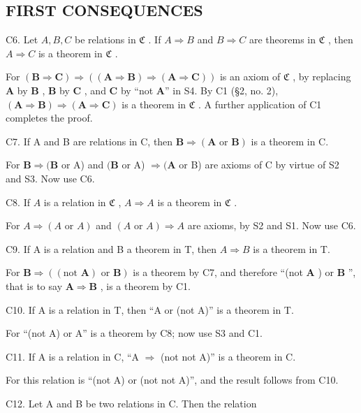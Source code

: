 \subsection{FIRST CONSEQUENCES}

C6. Let \(A, B, C\) be relations in \(\mathfrak{C}\) . If \(A \Longrightarrow B\) and \(B \Longrightarrow C\) are theorems in \(\mathfrak{C}\) , then \(A \Longrightarrow C\) is a theorem in \(\mathfrak{C}\) .

For \((\pmb{B} \Rightarrow \pmb{C}) \Rightarrow ((\pmb{A} \Rightarrow \pmb{B}) \Rightarrow (\pmb{A} \Rightarrow \pmb{C}))\) is an axiom of \(\mathfrak{C}\) , by replacing \(\pmb{A}\) by \(\pmb{B}\) , \(\pmb{B}\) by \(\pmb{C}\) , and \(\pmb{C}\) by ``not \(\pmb{A}\)'' in S4. By C1 (§2, no. 2), \((\pmb{A} \Rightarrow \pmb{B}) \Rightarrow (\pmb{A} \Rightarrow \pmb{C})\) is a theorem in \(\mathfrak{C}\) . A further application of C1 completes the proof.

C7. If A and B are relations in C, then \(\mathbf{B} \Longrightarrow (\mathbf{A} \text{ or } \mathbf{B})\) is a theorem in C.

For \(\boldsymbol{B}\Longrightarrow(\boldsymbol{B}\) or A) and \((\boldsymbol{B}\) or A) \(\Longrightarrow(\boldsymbol{A}\) or B) are axioms of C by virtue of S2 and S3. Now use C6.

C8. If \(A\) is a relation in \(\mathfrak{C}\) , \(A \Longrightarrow A\) is a theorem in \(\mathfrak{C}\) .

For \(A \Longrightarrow (A \text{ or } A)\) and \((A \text{ or } A) \Longrightarrow A\) are axioms, by S2 and S1. Now use C6.

C9. If A is a relation and B a theorem in T, then \(A \Longrightarrow B\) is a theorem in T.

For \(\boldsymbol{B} \Rightarrow ((\text{not } \boldsymbol{A}) \text{ or } \boldsymbol{B})\) is a theorem by C7, and therefore ``(not \(\boldsymbol{A}\) ) or \(\boldsymbol{B}\) '', that is to say \(\boldsymbol{A} \Rightarrow \boldsymbol{B}\) , is a theorem by C1.

C10. If A is a relation in T, then ``A or (not A)'' is a theorem in T.

For ``(not A) or A'' is a theorem by C8; now use S3 and C1.

C11. If A is a relation in C, ``A \(\Longrightarrow\) (not not A)'' is a theorem in C.

For this relation is ``(not A) or (not not A)'', and the result follows from C10.

C12. Let A and B be two relations in C. Then the relation

